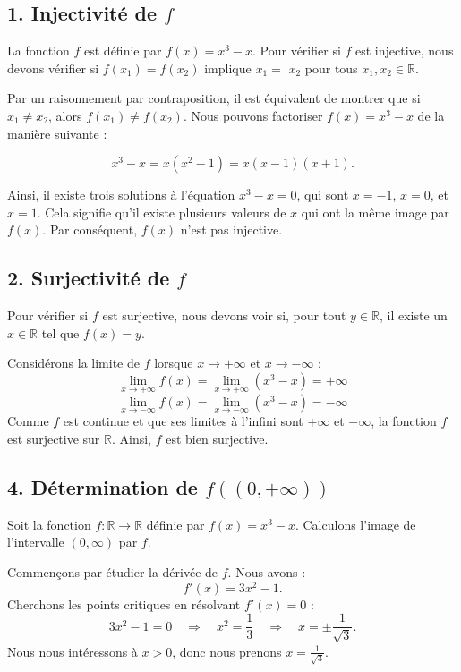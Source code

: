 \documentclass[a4paper,oneside,12pt]{amsbook}
\newcommand{\R}{\mathbb{R}}
\theoremstyle{definition}
\theoremstyle{remark}
\begin{document}
\subsection*{1. Injectivité de $f$}

La fonction $f$ est définie par $f(x) = x^3 - x$. Pour vérifier si $f$ est injective, nous devons vérifier si $f(x_1) = f(x_2)$ implique $x_1 = $ $x_2$ pour tous $x_1, x_2 \in \mathbb{R}$. 

Par un raisonnement par contraposition, il est équivalent de montrer que si $x_1 \neq x_2$, alors $f(x_1) \neq f(x_2)$. Nous pouvons factoriser $f(x) = x^3 - x$ de la manière suivante :

\[
x^3 - x = x(x^2 - 1) = x(x - 1)(x + 1).
\]

Ainsi, il existe trois solutions à l'équation $x^3 - x = 0$, qui sont $x = -1$, $x = 0$, et $x = 1$. Cela signifie qu'il existe plusieurs valeurs de $x$ qui ont la même image par $f(x)$. Par conséquent, $f(x)$ n'est pas injective.
\subsection*{2. Surjectivité de $f$}

Pour vérifier si $f$ est surjective, nous devons voir si, pour tout $y \in \mathbb{R}$, il existe un $x \in \mathbb{R}$ tel que $f(x) = y$.

Considérons la limite de $f$ lorsque $x \to +\infty$ et $x \to -\infty$ :
\[
\lim_{x \to +\infty} f(x) = \lim_{x \to +\infty} (x^3 - x) = +\infty
\]
\[
\lim_{x \to -\infty} f(x) = \lim_{x \to -\infty} (x^3 - x) = -\infty
\]
Comme $f$ est continue et que ses limites à l'infini sont $+\infty$ et $-\infty$, la fonction $f$ est surjective sur $\mathbb{R}$. Ainsi, $f$ est bien surjective.



\subsection*{4. Détermination de $f((0, +\infty))$}

Soit la fonction $f : \R \to \R$ définie par $f(x) = x^3 - x$. Calculons l'image de l'intervalle $(0, \infty)$ par $f$.

Commençons par étudier la dérivée de $f$. Nous avons :
\[
f'(x) = 3x^2 - 1.
\]
Cherchons les points critiques en résolvant $f'(x) = 0$ :
\[
3x^2 - 1 = 0 \quad \Rightarrow \quad x^2 = \frac{1}{3} \quad \Rightarrow \quad x = \pm \frac{1}{\sqrt{3}}.
\]
Nous nous intéressons à $x > 0$, donc nous prenons $x = \frac{1}{\sqrt{3}}$.
\end{document}
